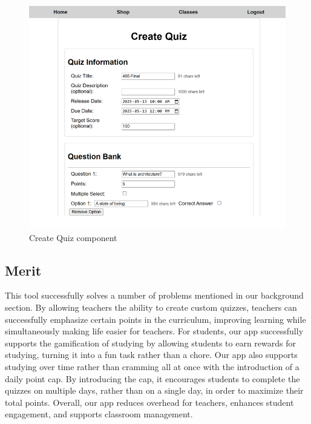 \begin{enumerate}
\begin{figure}[H]
        \includegraphics[width=0.7\linewidth]{PUT INDIVIDUAL SECTIONS HERE/images/createQuiz.png}
        \caption{Create Quiz component}
        \label{create-quiz}
    \end{figure}
        
\end{enumerate}
\subsection{Merit}
This tool successfully solves a number of problems mentioned in our background section. By allowing teachers the ability to create custom quizzes, teachers can successfully emphasize certain points in the curriculum, improving learning while simultaneously making life easier for teachers. For students, our app successfully supports the gamification of studying by allowing students to earn rewards for studying, turning it into a fun task rather than a chore. Our app also supports studying over time rather than cramming all at once with the introduction of a daily point cap. By introducing the cap, it encourages students to complete the quizzes on multiple days, rather than on a single day, in order to maximize their total points. Overall, our app reduces overhead for teachers, enhances student engagement, and supports classroom management.


